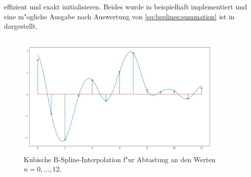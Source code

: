 effizient und exakt initialisieren. 
Beides wurde in  beispielhaft implementiert und eine m"ogliche Ausgabe nach Auswertung von \eqref{eq:bsplines:summation} ist in  dargestellt.
%
\begin{listing}[t]
\inputminted[firstline=4]{python3}{code/bsplines_coeffs.py}
\label{py:bsplines:coeffs}
\end{listing}
%
\begin{figure}[t]
    \centering\includegraphics[width=0.9\textwidth]{img/bsplines/interpol.png}
    \caption{Kubische B-Spline-Interpolation f"ur Abtastung an den Werten $n = 0, \dots, 12$.}\label{fig:bsplines:interpol}
\end{figure}
%
%
%
